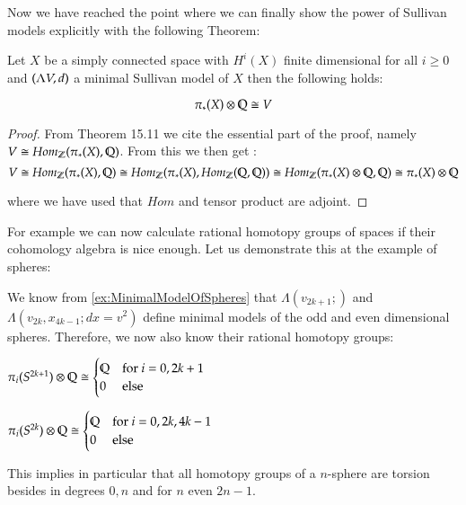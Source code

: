 Now we have reached the point where we can finally show the power of Sullivan models explicitly with the following Theorem:

\begin{Theorem}
 Let $X$ be a simply connected space with $H^i(X)$ finite dimensional for all $i \geq 0$ and 
 $(\Lambda V,d)$ a minimal Sullivan model of $X$ then the following holds:
 
 $$ \pi_*(X) \otimes \mathbb{Q} \cong V$$
\end{Theorem}

\begin{proof}
 From  \cite{Felix2001} Theorem 15.11 we cite the essential part of the proof, namely $V \cong Hom_{\mathbb{Z}}(\pi_*(X), \mathbb{Q})$. 
 From this we then get :
 $$ V \cong Hom_{\mathbb{Z}}(\pi_*(X), \mathbb{Q}) \cong Hom_{\mathbb{Z}}(\pi_*(X), Hom_{\mathbb{Z}}(\mathbb{Q}, \mathbb{Q})) \cong 
  Hom_{\mathbb{Z}}(\pi_*(X) \otimes \mathbb{Q}, \mathbb{Q}) \cong \pi_*(X) \otimes \mathbb{Q}$$
  
  where we have used that $Hom$ and tensor product are adjoint.
\end{proof}

For example we can now calculate rational homotopy groups of spaces if their cohomology algebra is nice enough. Let us
demonstrate this at the example of spheres:

\begin{Example}
 We know from \ref{ex:MinimalModelOfSpheres} that $\Lambda(v_{2k+1};)$ and $\Lambda(v_{2k}, x_{4k -1}; dx = v^2)$
 define minimal models of the odd and even dimensional spheres. Therefore, we now also know their rational homotopy groups:
 
 \begin{multicols}{2}
  $\pi_i(S^{2k+1}) \otimes \mathbb{Q} \cong
  \begin{cases}
  \mathbb{Q}  	&\text{for $i = 0, 2k+1$} \\
  0 	&\text{else}
  \end{cases}
  $
  
  \columnbreak
  
  $\pi_i(S^{2k}) \otimes \mathbb{Q} \cong
  \begin{cases}
  \mathbb{Q}  	&\text{for $i = 0, 2k, 4k -1 $} \\
  0 	&\text{else}
  \end{cases}
  $
 \end{multicols}
This implies in particular that all homotopy groups of a $n$-sphere are torsion besides in degrees $0, n$
and for $n$ even $2n -1$.
\end{Example}


